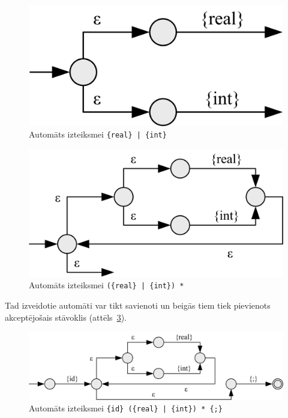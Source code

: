 \begin{figure}[H]
  \centering
    \includegraphics[scale=1.5]{pictures/auto_or_ex}
  \caption{\label{fig:auto_or_ex}Automāts izteiksmei \texttt{\{real\} | \{int\}}}
\end{figure}

\begin{figure}[H]
  \centering
    \includegraphics[scale=1.5]{pictures/auto_asterisk_ex}
  \caption{\label{fig:auto_asterisk_ex}Automāts izteiksmei \texttt{(\{real\} | \{int\}) *}}
\end{figure}

Tad izveidotie automāti var tikt savienoti un beigās tiem tiek pievienots akceptējošais stāvoklis (attēls~\ref{fig:auto_full_ex}).

\begin{figure}[H]
  \centering
    \includegraphics[scale=1.25]{pictures/auto_full_ex}
  \caption{\label{fig:auto_full_ex}Automāts izteiksmei \texttt{\{id\} (\{real\} | \{int\}) * \{;\}}}
\end{figure}

